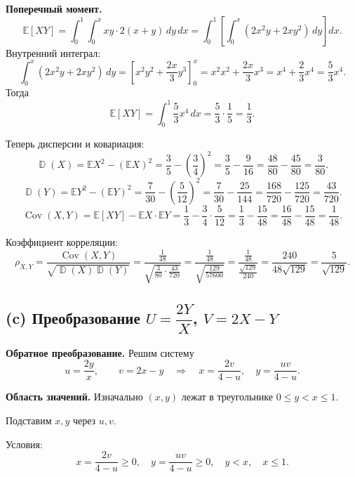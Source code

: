 \documentclass[12pt]{article}
\DeclareMathOperator{\Var}{\mathbb{D}}
\DeclareMathOperator{\Cov}{Cov}
\newcommand{\E}{\mathbb{E}}
\begin{document}
    \textbf{Поперечный момент.}
    \[
        \E[XY]
        = \int_0^1 \int_0^x x y \cdot 2(x+y)\,dy\,dx
        = \int_0^1 \left[ \int_0^x (2x^2 y + 2x y^2)\,dy \right] dx.
    \]
    Внутренний интеграл:
    \[
        \int_0^x (2x^2 y + 2x y^2)\,dy
        = \left[x^2 y^2 + \frac{2x}{3}y^3\right]_0^x
        = x^2 x^2 + \frac{2x}{3} x^3
        = x^4 + \frac{2}{3}x^4
        = \frac{5}{3}x^4.
    \]
    Тогда
    \[
        \E[XY]
        = \int_0^1 \frac{5}{3}x^4\,dx
        = \frac{5}{3}\cdot \frac{1}{5}
        = \frac{1}{3}.
    \]

    Теперь дисперсии и ковариация:
    \[
        \Var(X) = \E X^2 - (\E X)^2
        = \frac{3}{5} - \left(\frac{3}{4}\right)^2
        = \frac{3}{5} - \frac{9}{16}
        = \frac{48}{80} - \frac{45}{80}
        = \frac{3}{80}.
    \]
    \[
        \Var(Y) = \E Y^2 - (\E Y)^2
        = \frac{7}{30} - \left(\frac{5}{12}\right)^2
        = \frac{7}{30} - \frac{25}{144}
        = \frac{168}{720} - \frac{125}{720}
        = \frac{43}{720}.
    \]
    \[
        \Cov(X,Y)
        = \E[XY] - \E X \cdot \E Y
        = \frac{1}{3} - \frac{3}{4}\cdot \frac{5}{12}
        = \frac{1}{3} - \frac{15}{48}
        = \frac{16}{48} - \frac{15}{48}
        = \frac{1}{48}.
    \]

    Коэффициент корреляции:
    \[
        \rho_{X,Y}
        = \frac{\Cov(X,Y)}{\sqrt{\Var(X)\Var(Y)}}
        = \frac{\frac{1}{48}}{\sqrt{\frac{3}{80}\cdot \frac{43}{720}}}
        = \frac{\frac{1}{48}}{\sqrt{\frac{129}{57600}}}
        = \frac{\frac{1}{48}}{\frac{\sqrt{129}}{240}}
        = \frac{240}{48\sqrt{129}}
        = \frac{5}{\sqrt{129}}.
    \]

    \subsection*{(c) Преобразование $U = \dfrac{2Y}{X}$, $V = 2X - Y$}

    \textbf{Обратное преобразование.}
    Решим систему
    \[
        u = \frac{2y}{x}, \qquad v = 2x - y
        \quad \Longrightarrow \quad
        x = \frac{2v}{4-u},\quad
        y = \frac{u v}{4-u}.
    \]

    \textbf{Область значений.}
    Изначально $(x,y)$ лежат в треугольнике $0 \le y < x \le 1$.

    Подставим $x,y$ через $u,v$.

    Условия:
    \[
        x = \frac{2v}{4-u} \ge 0,\quad
        y = \frac{uv}{4-u} \ge 0,\quad
        y < x,\quad
        x \le 1.
    \]
\end{document}
